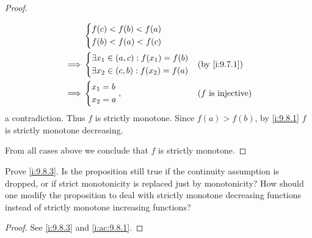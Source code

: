 \begin{proof}
\begin{itemize}
\begin{align*}
                     & \begin{dcases}
                         f(c) < f(b) < f(a) \\
                         f(b) < f(a) < f(c)
                       \end{dcases}                                                        \\
            \implies & \begin{dcases}
                         \exists x_1 \in (a, c) : f(x_1) = f(b) \\
                         \exists x_2 \in (c, b) : f(x_2) = f(a) \\
                       \end{dcases} &  & \by{i:9.7.1}                                    \\
            \implies & \begin{dcases}
                         x_1 = b \\
                         x_2 = a
                       \end{dcases},                            &  & \text{(\(f\) is injective)}
          \end{align*}
          a contradiction.
          Thus \(f\) is strictly monotone.
          Since \(f(a) > f(b)\), by \cref{i:9.8.1} \(f\) is strictly monotone decreasing.
  \end{itemize}
  From all cases above we conclude that \(f\) is strictly monotone.
\end{proof}

\begin{ex}\label{i:ex:9.8.4}
  Prove \cref{i:9.8.3}.
  Is the proposition still true if the continuity assumption is dropped, or if strict monotonicity is replaced just by monotonicity?
  How should one modify the proposition to deal with strictly monotone decreasing functions instead of strictly monotone increasing functions?
\end{ex}

\begin{proof}
  See \cref{i:9.8.3} and \cref{i:ac:9.8.1}.
\end{proof}

